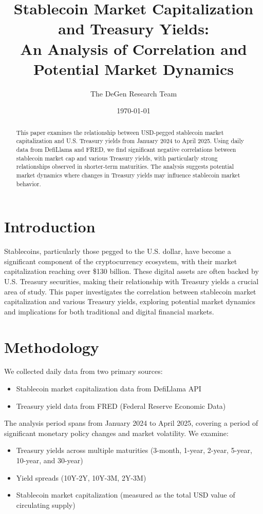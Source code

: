 \documentclass[12pt,a4paper]{article}
\title{Stablecoin Market Capitalization and Treasury Yields:\\
An Analysis of Correlation and Potential Market Dynamics}
\author{The DeGen Research Team}
\date{\today}
\begin{document}
\maketitle

\begin{abstract}
This paper examines the relationship between USD-pegged stablecoin market capitalization and U.S. Treasury yields from January 2024 to April 2025. Using daily data from DefiLlama and FRED, we find significant negative correlations between stablecoin market cap and various Treasury yields, with particularly strong relationships observed in shorter-term maturities. The analysis suggests potential market dynamics where changes in Treasury yields may influence stablecoin market behavior.
\end{abstract}

\section{Introduction}
Stablecoins, particularly those pegged to the U.S. dollar, have become a significant component of the cryptocurrency ecosystem, with their market capitalization reaching over \$130 billion. These digital assets are often backed by U.S. Treasury securities, making their relationship with Treasury yields a crucial area of study. This paper investigates the correlation between stablecoin market capitalization and various Treasury yields, exploring potential market dynamics and implications for both traditional and digital financial markets.

\section{Methodology}
We collected daily data from two primary sources:
\begin{itemize}
    \item Stablecoin market capitalization data from DefiLlama API
    \item Treasury yield data from FRED (Federal Reserve Economic Data)
\end{itemize}

The analysis period spans from January 2024 to April 2025, covering a period of significant monetary policy changes and market volatility. We examine:
\begin{itemize}
    \item Treasury yields across multiple maturities (3-month, 1-year, 2-year, 5-year, 10-year, and 30-year)
    \item Yield spreads (10Y-2Y, 10Y-3M, 2Y-3M)
    \item Stablecoin market capitalization (measured as the total USD value of circulating supply)
\end{itemize}
\end{document}
